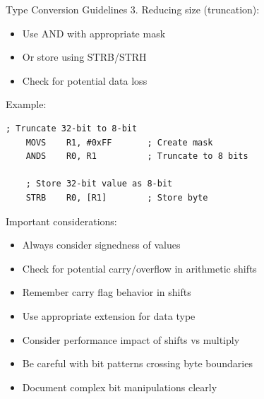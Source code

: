\begin{KR}{Type Conversion Guidelines}
3. Reducing size (truncation):
\begin{itemize}
  \item Use AND with appropriate mask
  \item Or store using STRB/STRH
  \item Check for potential data loss
\end{itemize}


Example:
\begin{lstlisting}[language=armasm, style=basesmol]
    ; Truncate 32-bit to 8-bit
    MOVS    R1, #0xFF       ; Create mask
    ANDS    R0, R1          ; Truncate to 8 bits

    ; Store 32-bit value as 8-bit
    STRB    R0, [R1]        ; Store byte 
\end{lstlisting}
\end{KR}


\raggedcolumns

\begin{remark}
Important considerations:
\begin{itemize}
  \item Always consider signedness of values
  \item Check for potential carry/overflow in arithmetic shifts
  \item Remember carry flag behavior in shifts
  \item Use appropriate extension for data type
  \item Consider performance impact of shifts vs multiply
  \item Be careful with bit patterns crossing byte boundaries
  \item Document complex bit manipulations clearly
\end{itemize}
\end{remark}



